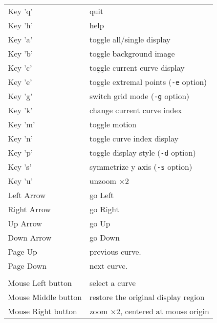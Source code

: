\begin{tabular}{ll}
Key 'q'			& quit \\
Key 'h'			& help \\
Key 'a'			& toggle all/single display \\
Key 'b'			& toggle background image \\
Key 'c'			& toggle current curve display \\
Key 'e'			& toggle extremal points (\verb+-e+ option) \\
Key 'g'			& switch grid mode (\verb+-g+ option) \\
Key 'k'			& change current curve index \\
Key 'm'			& toggle motion \\
Key 'n'			& toggle curve index display \\
Key 'p'			& toggle display style (\verb+-d+ option)\\
Key 's'			& symmetrize y axis (\verb+-s+ option)\\
Key 'u'			& unzoom $\times 2$ \\
Left Arrow		& go Left\\
Right Arrow		& go Right\\
Up Arrow		& go Up\\
Down Arrow		& go Down\\
Page Up      		& previous curve.\\
Page Down    		& next curve.\\
\\
Mouse Left button 	& select a curve \\
Mouse Middle button 	& restore the original display region \\
Mouse Right button	& zoom $\times 2$, centered at mouse origin \\
\end{tabular}
